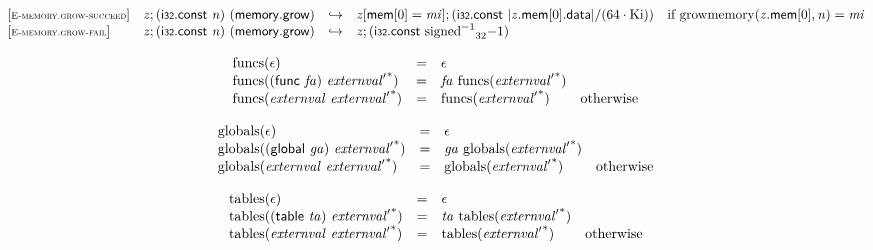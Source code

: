 \vspace{1ex}

$$
\begin{array}{@{}l@{}lcl@{}l@{}}
{[\textsc{\scriptsize E{-}memory.grow{-}succeed}]} \quad & {\mathit{z}} ; (\mathsf{i{\scriptstyle32}}.\mathsf{const}~{\mathit{n}})~(\mathsf{memory.grow}) &\hookrightarrow& {\mathit{z}}{}[\mathsf{mem}{}[0] = {\mathit{mi}}] ; (\mathsf{i{\scriptstyle32}}.\mathsf{const}~{|{{\mathit{z}}.\mathsf{mem}}{{}[0]}.\mathsf{data}|} / (64 \cdot {\mathrm{Ki}})) &\quad
  \mbox{if}~{\mathrm{growmemory}}({{\mathit{z}}.\mathsf{mem}}{{}[0]}, {\mathit{n}}) = {\mathit{mi}} \\
{[\textsc{\scriptsize E{-}memory.grow{-}fail}]} \quad & {\mathit{z}} ; (\mathsf{i{\scriptstyle32}}.\mathsf{const}~{\mathit{n}})~(\mathsf{memory.grow}) &\hookrightarrow& {\mathit{z}} ; (\mathsf{i{\scriptstyle32}}.\mathsf{const}~{{{{{\mathrm{signed}}^{{-1}}}}{}}_{32}}{{-1}}) &  \\
\end{array}
$$

$$
\begin{array}{@{}lcl@{}l@{}}
{\mathrm{funcs}}(\epsilon) &=& \epsilon &  \\
{\mathrm{funcs}}((\mathsf{func}~{\mathit{fa}})~{{\mathit{externval}'}^\ast}) &=& {\mathit{fa}}~{\mathrm{funcs}}({{\mathit{externval}'}^\ast}) &  \\
{\mathrm{funcs}}({\mathit{externval}}~{{\mathit{externval}'}^\ast}) &=& {\mathrm{funcs}}({{\mathit{externval}'}^\ast}) &\quad
  \mbox{otherwise} \\
\end{array}
$$

$$
\begin{array}{@{}lcl@{}l@{}}
{\mathrm{globals}}(\epsilon) &=& \epsilon &  \\
{\mathrm{globals}}((\mathsf{global}~{\mathit{ga}})~{{\mathit{externval}'}^\ast}) &=& {\mathit{ga}}~{\mathrm{globals}}({{\mathit{externval}'}^\ast}) &  \\
{\mathrm{globals}}({\mathit{externval}}~{{\mathit{externval}'}^\ast}) &=& {\mathrm{globals}}({{\mathit{externval}'}^\ast}) &\quad
  \mbox{otherwise} \\
\end{array}
$$

$$
\begin{array}{@{}lcl@{}l@{}}
{\mathrm{tables}}(\epsilon) &=& \epsilon &  \\
{\mathrm{tables}}((\mathsf{table}~{\mathit{ta}})~{{\mathit{externval}'}^\ast}) &=& {\mathit{ta}}~{\mathrm{tables}}({{\mathit{externval}'}^\ast}) &  \\
{\mathrm{tables}}({\mathit{externval}}~{{\mathit{externval}'}^\ast}) &=& {\mathrm{tables}}({{\mathit{externval}'}^\ast}) &\quad
  \mbox{otherwise} \\
\end{array}
$$

